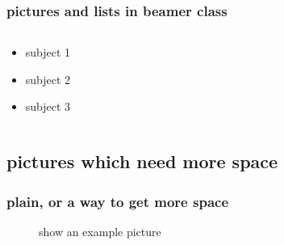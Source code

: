 \documentclass{beamer}
\begin{document}
\begin{frame}
\frametitle{pictures and lists in beamer class}
\begin{columns}
\begin{column}{5cm}
\begin{itemize}
\item<1-> subject 1
\item<3-> subject 2
\item<5-> subject 3
\end{itemize}
\vspace{3cm} 
\end{column}
\begin{column}{5cm}
\end{column}
\end{columns}
\end{frame}


\subsection{pictures which need more space} 
\begin{frame}[plain]
\frametitle{plain, or a way to get more space}
\begin{figure}
\caption{show an example picture}
\end{figure}
\end{frame}
\end{document}
